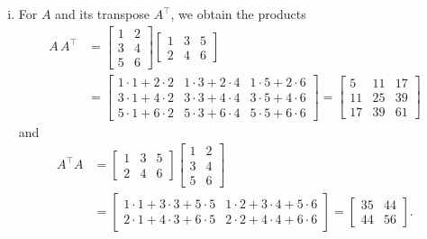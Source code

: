 \begin{example}
\begin{enumerate}[(i)]
	\item For $A$ and its transpose $A^\top$, we obtain the products
	\begin{equation*} \begin{split}
	A \, A^\top & = \begin{bmatrix}
	1 & 2 \\ 3 & 4 \\ 5 & 6
	\end{bmatrix} \begin{bmatrix}
	1 & 3 & 5 \\ 2 & 4 & 6
	\end{bmatrix} \\ & = \begin{bmatrix}
	 1 \cdot 1 + 2 \cdot 2 & 1 \cdot 3 + 2 \cdot 4 & 1 \cdot 5 + 2 \cdot 6 \\
	 3 \cdot 1 + 4 \cdot 2 & 3 \cdot 3 + 4 \cdot 4 & 3 \cdot 5 + 4 \cdot 6 \\ 
	 5 \cdot 1 + 6 \cdot 2 & 5 \cdot 3 + 6 \cdot 4 & 5 \cdot 5 + 6 \cdot 6
	\end{bmatrix} = \begin{bmatrix}
	5 & 11 & 17 \\ 11 & 25 & 39 \\ 17 & 39 & 61
	\end{bmatrix}
	\end{split} \end{equation*}
	and
	\begin{equation*}\begin{split}
    A^\top A & = \begin{bmatrix}
	1 & 3 & 5 \\ 2 & 4 & 6
	\end{bmatrix} \begin{bmatrix}
	1 & 2 \\ 3 & 4 \\ 5 & 6
	\end{bmatrix} \\ & = \begin{bmatrix}
	1 \cdot 1 + 3 \cdot 3 + 5 \cdot 5 & 1 \cdot 2 + 3 \cdot 4 + 5 \cdot 6 \\
	2 \cdot 1 + 4 \cdot 3 + 6 \cdot 5 & 2 \cdot 2 + 4 \cdot 4 + 6 \cdot 6
	\end{bmatrix} = \begin{bmatrix}
	35 & 44 \\ 44 & 56
	\end{bmatrix}.
	\end{split}\end{equation*}
\end{enumerate}
\end{example}

